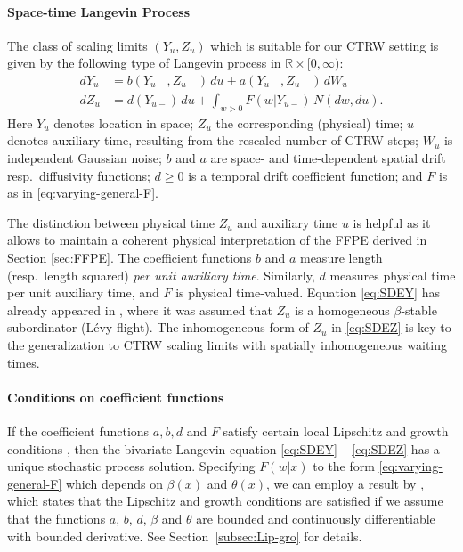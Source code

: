 \documentclass[a4paper,12pt]{elsarticle}
\numberwithin{equation}{section}
\theoremstyle{plain}
\theoremstyle{definition}
\theoremstyle{remark}
\numberwithin{equation}{section}
\newcommand{\spc}{\mathbb R}
\newcommand{\spctim}{\spc \times [0,\infty)}
\newcommand{\1}{\mathbf 1}
\begin{document}
\paragraph{Space-time Langevin Process}
The class of scaling limits $(Y_u, Z_u)$ which is suitable for our CTRW setting 
is given by the following type of Langevin process in $\spctim$: 
\begin{align} \label{eq:SDEY}
dY_u &= b(Y_{u-}, Z_{u-})\,du + a(Y_{u-}, Z_{u-})\, dW_u \\
\label{eq:SDEZ}
dZ_u &= d(Y_{u-})\,du + \int_{w > 0} F(w | Y_{u-}) \, N(dw, du).
\end{align}
Here $Y_u$ denotes location in space; $Z_u$ the corresponding (physical) time;
$u$ denotes auxiliary time, resulting from the rescaled number of CTRW steps;
$W_u$ is independent Gaussian noise; $b$ and $a$ are space- and time-dependent
spatial drift resp.\ diffusivity functions; $d \ge 0$ is a temporal drift coefficient function;
and $F$ is as in \eqref{eq:varying-general-F}.

The distinction between physical time $Z_u$ and auxiliary time $u$ is helpful
as it allows to maintain a coherent physical interpretation of the FFPE derived
in Section \ref{sec:FFPE}.  The coefficient functions $b$ and $a$ measure
length (resp.\ length squared) \emph{per unit auxiliary time}.  Similarly,
$d$ measures physical time per unit auxiliary time, and $F$ is physical
time-valued.
Equation \eqref{eq:SDEY} has already appeared in \citep{Weron2008}, where
it was assumed that $Z_u$ is a homogeneous $\beta$-stable subordinator (L\'evy
flight).
The inhomogeneous form of $Z_u$ in \eqref{eq:SDEZ} is key to the generalization
to CTRW scaling limits with spatially inhomogeneous waiting times.



\paragraph{Conditions on coefficient functions}
If the coefficient functions $a, b, d$ and $F$ satisfy certain local 
Lipschitz and growth conditions \citep[Chapter 6]{Applebaum}, then the bivariate
Langevin equation \eqref{eq:SDEY} -- \eqref{eq:SDEZ} has a unique stochastic 
process solution.  Specifying $F(w|x)$ to the form \eqref{eq:varying-general-F} which depends on 
$\beta(x)$ and $\theta(x)$, we can employ a result by \citep{Tsuchiya1992}, 
which states that the Lipschitz and growth conditions are 
satisfied if we assume that the functions $a$, $b$, $d$, $\beta$ and $\theta$ 
are bounded and continuously differentiable with bounded derivative.
See Section~\ref{subsec:Lip-gro} for details.
\end{document}
